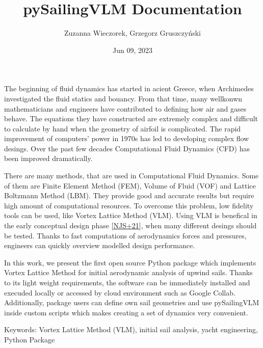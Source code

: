 \documentclass[letterpaper,10pt,english]{jupyterBook}
\title{pySailingVLM Documentation}
\date{Jun 09, 2023}
\author{Zuzanna Wieczorek, Grzegorz Gruszczyński}
\begin{document}
\pagestyle{empty}
\sphinxmaketitle
 
\clearpage

\pagestyle{plain}
\sphinxtableofcontents
\pagestyle{normal}
\label{\detokenize{chapters/intro::doc}}


\sphinxAtStartPar
The beginning of fluid dynamics has started in acient Greece, when Archimedes investigated the fluid statics and bouancy. From that time, many well\sphinxhyphen{}konwn mathematicians and engineers have contributed to defining how air and gases behave. The equations they have constructed are extremely complex and difficult to calculate by hand when the geometry of airfoil is complicated. The rapid improvement of computers’ power in 1970s has led to developing complex flow desings. Over the past few decades Computational Fluid Dynamics (CFD) has been improved dramatically.

\sphinxAtStartPar
There are many methods, that are used in Computational Fluid Dynamics. Some of them are Finite Element Method (FEM), Volume of Fluid (VOF) and Lattice Boltzmann Method (LBM). They provide good and accurate results but require high amount of computational resources. To overcome this problem, low fidelity tools can be used, like Vortex Lattice Method (VLM). Using VLM is benefical in the early conceptual design phase {[}\hyperlink{cite.chapters/bibliography:id9}{NJS+21}{]}, when many different desings should be tested. Thanks to fast computations of aerodynamics forces and pressures, engineers can quickly overview modelled design performance.

\sphinxAtStartPar
In this work, we present the first open source Python package which implements Vortex Lattice Method for initial aerodynamic analysis of upwind sails. Thanks to its light weight requirements, the software can be immediately installed and execuded locally or accessed by cloud environment such as Google Collab. Additionally, package users can define own sail geometries and use pySailingVLM inside custom scripts which makes creating a set of dynamics very convenient.

\sphinxAtStartPar
Keywords: Vortex Lattice Method (VLM), initial sail analysis, yacht engineering, Python Package
\end{document}
